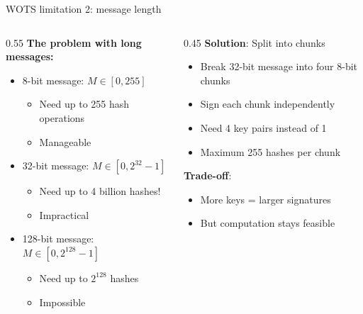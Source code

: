 \ifdefined\PRESENTATION\else\PassOptionsToClass{handout}{beamer}\fi\documentclass[aspectratio=169, lualatex]{beamer}
\begin{document}
\begin{frame}{WOTS limitation 2: message length}
	\begin{columns}[c]
		\begin{column}{0.55\textwidth}
			\textbf{The problem with long messages:}
			\begin{itemize}
				\item 8-bit message: $M \in [0, 255]$
				      \begin{itemize}
					      \item Need up to 255 hash operations
					      \item Manageable
				      \end{itemize}
				\item 32-bit message: $M \in [0, 2^{32}-1]$
				      \begin{itemize}
					      \item Need up to 4 billion hashes!
					      \item Impractical
				      \end{itemize}
				\item 128-bit message: $M \in [0, 2^{128}-1]$
				      \begin{itemize}
					      \item Need up to $2^{128}$ hashes
					      \item Impossible
				      \end{itemize}
			\end{itemize}
		\end{column}
		\begin{column}{0.45\textwidth}
			\textbf{Solution}: Split into chunks
			\begin{itemize}
				\item Break 32-bit message into four 8-bit chunks
				\item Sign each chunk independently
				\item Need 4 key pairs instead of 1
				\item Maximum 255 hashes per chunk
			\end{itemize}

			\textbf{Trade-off}:
			\begin{itemize}
				\item More keys = larger signatures
				\item But computation stays feasible
			\end{itemize}
		\end{column}
	\end{columns}
\end{frame}
\end{document}
